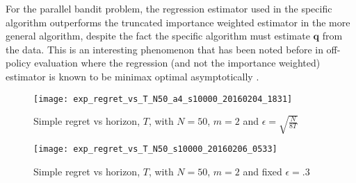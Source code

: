 For the parallel bandit problem, the regression estimator used in the specific algorithm outperforms the truncated importance weighted estimator in the more general algorithm, despite the fact the specific algorithm must estimate $\boldsymbol{q}$ from the data. 
This is an interesting phenomenon that has been noted before in off-policy evaluation where the regression (and not the importance weighted) estimator is known to be minimax optimal asymptotically \citep{LMS14}.

\begin{figure}
\centering
\texttt{[image: exp\_regret\_vs\_T\_N50\_a4\_s10000\_20160204\_1831]}
\caption{Simple regret vs horizon, $T$, with $N = 50$, $m=2$ and $\epsilon = \sqrt{\frac{N}{8T}}$}
\label{fig:simple_vs_T_vary_epsilon}
\end{figure}

\begin{figure}
\centering
\texttt{[image: exp\_regret\_vs\_T\_N50\_s10000\_20160206\_0533]}
\caption{Simple regret vs horizon, $T$, with $N = 50$, $m=2$ and fixed $\epsilon = .3$}
\label{fig:simple_vs_T}
\end{figure}
